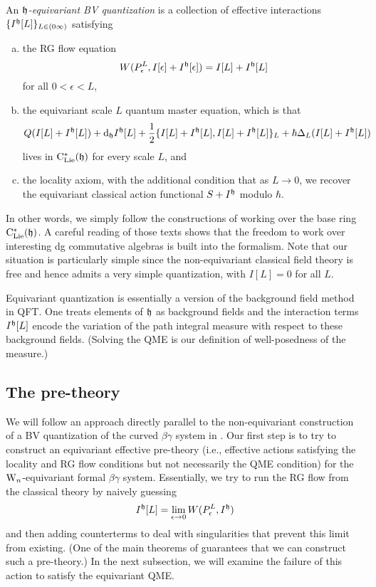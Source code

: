\begin{dfn} \label{eqQFT} 
An {\em $\mathfrak h$-equivariant BV quantization} is a collection of effective interactions $\{I^\mathfrak h[L]\}_{L \in (0\infty)}$
satisfying
\begin{enumerate}[(a)]
\item the RG flow equation
\[
W(P_\epsilon^L, I[\epsilon]+I^\mathfrak h[\epsilon]) = I[L] + I^\mathfrak h[L]
\]
for all $0 < \epsilon < L$,
\item the equivariant scale $L$ quantum master equation, which is that
\[
Q(I[L]+I^\mathfrak h[L]) + {\rm d}_\mathfrak h I^\mathfrak h[L] + \frac{1}{2}\{I[L]+I^\mathfrak h[L],I[L]+I^\mathfrak h[L]\}_{L} + \hbar \Delta_L(I[L]+I^\mathfrak h[L])
\]
lives in ${\rm C}_{\rm Lie}^*(\mathfrak h)$ for every scale $L$, and
\item the locality axiom, with the additional condition that as $L \to 0$, we recover the equivariant classical action functional $S+ I^\mathfrak h$ modulo $\hbar$.
\end{enumerate}
\end{dfn}

In other words, we simply follow the constructions of \cite{CosBook,CG} working over the base ring ${\rm C}_{\rm Lie}^*(\mathfrak h)$.
A careful reading of those texts shows that the freedom to work over interesting dg commutative algebras is built into the formalism.
Note that our situation is particularly simple since the non-equivariant classical field theory is free and hence admits a very simple quantization,
with $I[L] = 0$ for all $L$.

\begin{rmk}
Equivariant quantization is essentially a version of the background field method in QFT.
One treats elements of $\mathfrak h$ as background fields and 
the interaction terms $I^\mathfrak h[L]$ encode the variation of the path integral measure with respect to these background fields.
(Solving the QME is our definition of well-posedness of the measure.)
\end{rmk}

\subsection{The pre-theory}
\label{sec prequant}

We will follow an approach directly parallel to the non-equivariant construction of a BV quantization of the curved $\beta\gamma$ system in \cite{WG2}.
Our first step is to try to construct an equivariant effective pre-theory 
(i.e., effective actions satisfying the locality and RG flow conditions but not necessarily the QME condition)
for the ${{\rm W}_n}$-equivariant formal $\beta\gamma$ system.
Essentially, we try to run the RG flow from the classical theory by naively guessing
\[
I^\mathfrak h[L] = \lim_{\epsilon \to 0} W(P^L_\epsilon,I^\mathfrak h)
\]
and then adding counterterms to deal with singularities that prevent this limit from existing.
(One of the main theorems of \cite{CosBook} guarantees that we can construct such a pre-theory.)
In the next subsection, we will examine the failure of this action to satisfy the equivariant QME.

